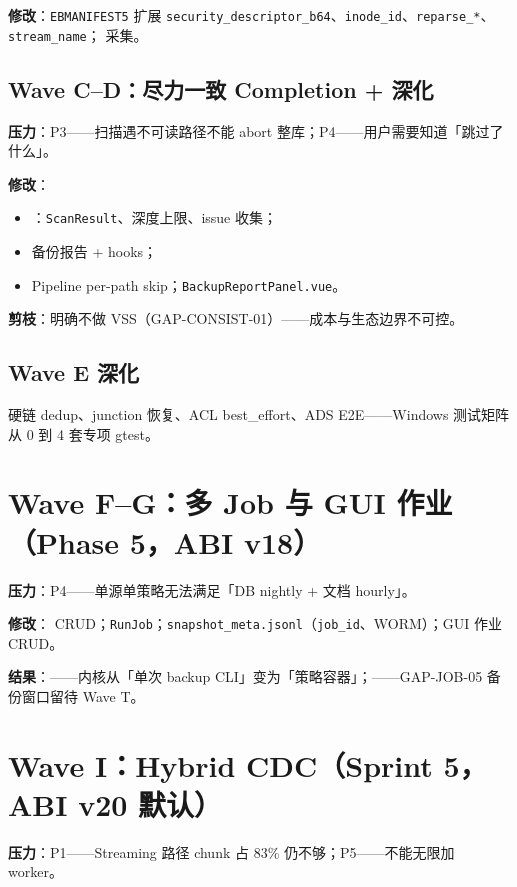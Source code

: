 \textbf{修改}：\texttt{EBMANIFEST5} 扩展 \texttt{security\_descriptor\_b64}、\texttt{inode\_id}、\texttt{reparse\_*}、\texttt{stream\_name}； 采集。

\subsection{Wave C--D：尽力一致 Completion + 深化}

\textbf{压力}：P3——扫描遇不可读路径不能 abort 整库；P4——用户需要知道「跳过了什么」。

\textbf{修改}：
\begin{itemize}[nosep]
  \item {}：\texttt{ScanResult}、深度上限、issue 收集；
  \item 备份报告  + hooks；
  \item Pipeline per-path skip；\texttt{BackupReportPanel.vue}。
\end{itemize}

\textbf{剪枝}：明确不做 VSS（GAP-CONSIST-01）——成本与生态边界不可控。

\subsection{Wave E 深化}

硬链 dedup、junction 恢复、ACL best\_effort、ADS E2E——Windows 测试矩阵从 0 到 4 套专项 gtest。

\section{Wave F--G：多 Job 与 GUI 作业（Phase 5，ABI v18）}

\textbf{压力}：P4——单源单策略无法满足「DB  nightly + 文档 hourly」。

\textbf{修改}： CRUD；\texttt{RunJob}；\texttt{snapshot\_meta.jsonl}（\texttt{job\_id}、WORM）；GUI  作业 CRUD。

\textbf{结果}：——内核从「单次 backup CLI」变为「策略容器」；——GAP-JOB-05 备份窗口留待 Wave T。

\section{Wave I：Hybrid CDC（Sprint 5，ABI v20 默认）}

\textbf{压力}：P1——Streaming 路径 chunk 占 83\% 仍不够；P5——不能无限加 worker。

